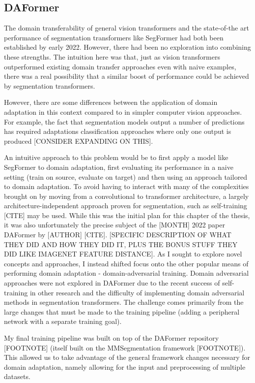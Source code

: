 \documentclass[a4paper,12pt]{report}
\begin{document}
\subsection*{DAFormer}

The domain transferability of general vision transformers and the state-of-the art performance of segmentation transformers like SegFormer had both been established by early 2022. However, there had been no exploration into combining these strengths.
The intuition here was that, just as vision transformers outperformed existing domain transfer approaches even with naive examples, there was a real possibility that a similar boost of performance could be achieved by segmentation transformers.

However, there are some differences between the application of domain adaptation in this context compared to in simpler computer vision approaches. For example, the fact that segmentation models output a number of predictions has required adaptations classification approaches where only one output is produced [CONSIDER EXPANDING ON THIS].

An intuitive approach to this problem would be to first apply a model like SegFormer to domain adaptation, first evaluating its performance in a naive setting (train on source, evaluate on target) and then using an approach tailored to domain adaptation. To avoid having to interact with many of the complexities brought on by moving from a convolutional to transformer architecture, a largely architecture-independent approach proven for segmentation, such as self-training [CITE] may be used. While this was the initial plan for this chapter of the thesis, it was also unfortunately the precise subject of the [MONTH] 2022 paper DAFormer by [AUTHOR] [CITE]. [SPECIFIC DESCRIPTION OF WHAT THEY DID AND HOW THEY DID IT, PLUS THE BONUS STUFF THEY DID LIKE IMAGENET FEATURE DISTANCE]. As I sought to explore novel concepts and approaches, I instead shifted focus onto the other popular means of performing domain adaptation - domain-adversarial training. Domain adversarial approaches were not explored in DAFormer due to the recent success of self-training in other research and the difficulty of implementing domain adversarial methods in segmentation transformers. The challenge comes primarily from the large changes that must be made to the training pipeline (adding a peripheral network with a separate training goal).

My final training pipeline was built on top of the DAFormer repository [FOOTNOTE] (itself built on the MMSegmentation framework [FOOTNOTE]). This allowed us to take advantage of the general framework changes necessary for domain adaptation, namely allowing for the input and preprocessing of multiple datasets.
\end{document}
